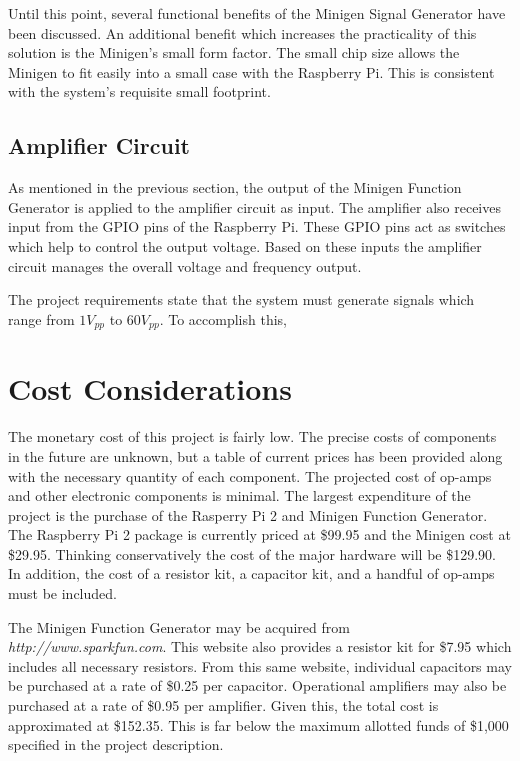 \documentclass{article}	%
\begin{document}
\begin{multicols}{2}
Until this point,
several functional benefits of the Minigen Signal Generator have been discussed.
An additional benefit which 
increases the practicality of this solution is the Minigen's small form factor.
The small chip size 
allows the Minigen to fit easily into a small case 
with the Raspberry Pi.
This is consistent with the system's requisite small footprint.

\subsection{Amplifier Circuit}
As mentioned in the previous section,
the output of the Minigen Function Generator
is applied to the amplifier circuit as input.
The amplifier also receives input from 
the GPIO pins of the Raspberry Pi.
These GPIO pins act as switches which help to control the output voltage.
Based on these inputs 
the amplifier circuit manages the overall 
voltage and frequency output.

The project requirements state that the system must 
generate signals which range from $1V_{pp}$ to $60V_{pp}$. 
To accomplish this,

\section{Cost Considerations}
The monetary cost of this project is fairly low. 
The precise costs of components in the future are unknown, but
a table 
of current prices has been provided
along with the necessary quantity of each component.
The projected cost of op-amps and other electronic components is minimal. 
The largest expenditure of the project is
the purchase of the 
Rasperry Pi 2 and 
Minigen Function Generator. 
The Raspberry Pi 2 package is currently priced at \$99.95 and
the Minigen cost at \$29.95.
Thinking conservatively the cost of the major hardware will be \$129.90. 
In addition, the cost of 
a resistor kit, 
a capacitor kit, and 
a handful of op-amps 
must be included.

The Minigen Function Generator may be acquired from 
\textit{http://www.sparkfun.com}.
This website also provides 
a resistor kit for \$7.95 
which includes all necessary resistors. 
From this same website,
individual capacitors may be purchased
at a rate of \$0.25 per capacitor.
Operational amplifiers may also be purchased at
a rate of \$0.95 per amplifier.
Given this,
the total cost is approximated at \$152.35. 
This is far below the maximum allotted funds of \$1,000
specified in the project description.


\end{multicols}
\end{document}

